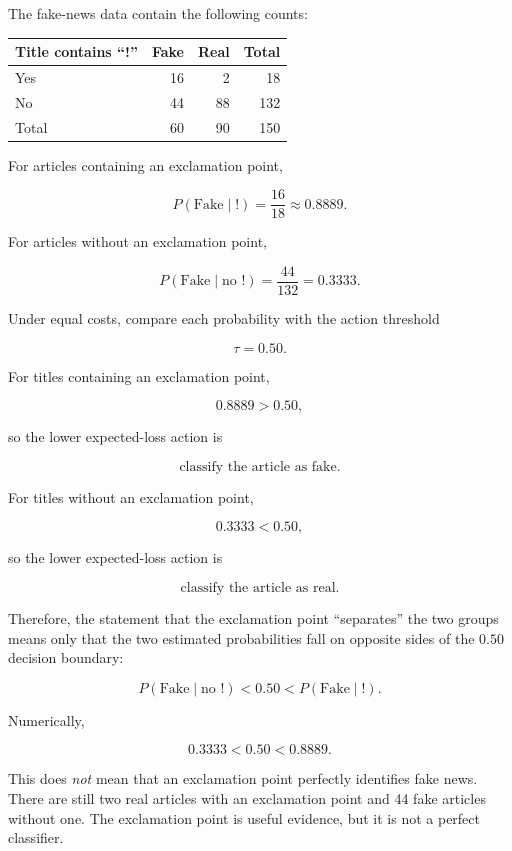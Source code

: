 \documentclass[11pt]{article}
\begin{document}
The fake-news data contain the following counts:

\begin{center}
\begin{tabular}{lrrr}
\toprule
Title contains ``!'' & Fake & Real & Total \\
\midrule
Yes & 16 & 2 & 18 \\
No  & 44 & 88 & 132 \\
\midrule
Total & 60 & 90 & 150 \\
\bottomrule
\end{tabular}
\end{center}

For articles containing an exclamation point,

\[
P(\text{Fake}\mid !)
=
\frac{16}{18}
\approx 0.8889.
\]

For articles without an exclamation point,

\[
P(\text{Fake}\mid \text{no }!)
=
\frac{44}{132}
=
0.3333.
\]

Under equal costs, compare each probability with the action threshold

\[
\tau=0.50.
\]

For titles containing an exclamation point,

\[
0.8889>0.50,
\]

so the lower expected-loss action is

\[
\boxed{\text{classify the article as fake}}.
\]

For titles without an exclamation point,

\[
0.3333<0.50,
\]

so the lower expected-loss action is

\[
\boxed{\text{classify the article as real}}.
\]

Therefore, the statement that the exclamation point ``separates'' the two
groups means only that the two estimated probabilities fall on opposite sides
of the $0.50$ decision boundary:

\[
\boxed{
P(\text{Fake}\mid\text{no }!)
<
0.50
<
P(\text{Fake}\mid !)
}.
\]

Numerically,

\[
\boxed{
0.3333 < 0.50 < 0.8889.
}
\]

This does \emph{not} mean that an exclamation point perfectly identifies fake
news. There are still two real articles with an exclamation point and 44 fake
articles without one. The exclamation point is useful evidence, but it is not
a perfect classifier.
\end{document}
